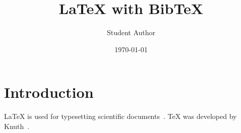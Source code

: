 \documentclass[12pt]{article}
\title{LaTeX with BibTeX}
\author{Student Author}
\date{\today}
\begin{document}
\maketitle

\section{Introduction}
LaTeX is used for typesetting scientific documents~\cite{lamport94}. 
\TeX{} was developed by Knuth~\cite{knuth84}.

\end{document}
